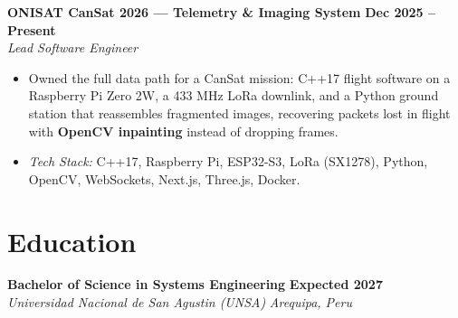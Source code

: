 \documentclass[11pt,letterpaper]{article}
\newcommand{\cventry}[4]{%
  \textbf{#1} \hfill \textbf{#2}\\
  \textit{#3} \hfill \textit{#4}\par\nobreak\vspace{1pt}%
}
\begin{document}

\cventry{ONISAT CanSat 2026 --- Telemetry \& Imaging System}{Dec 2025 -- Present}{Lead Software Engineer}{}
\begin{itemize}
  \item Owned the full data path for a CanSat mission: C++17 flight software on a Raspberry Pi Zero 2W, a 433 MHz LoRa downlink, and a Python ground station that reassembles fragmented images, recovering packets lost in flight with \textbf{OpenCV inpainting} instead of dropping frames.
  \item \textit{Tech Stack:} C++17, Raspberry Pi, ESP32-S3, LoRa (SX1278), Python, OpenCV, WebSockets, Next.js, Three.js, Docker.
\end{itemize}

\section{Education}
\cventry{Bachelor of Science in Systems Engineering}{Expected 2027}{Universidad Nacional de San Agustin (UNSA)}{Arequipa, Peru}
\end{document}
